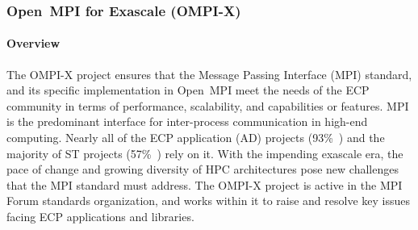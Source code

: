 \subsubsection{ Open~MPI for Exascale (OMPI-X)}\label{subsubsect:openmpi}



\paragraph{Overview}

The OMPI-X project ensures that the Message Passing Interface (MPI)
standard, and its specific implementation in Open~MPI meet the needs
of the ECP community in terms of performance, scalability, and
capabilities or features. MPI is the predominant interface for
inter-process communication in high-end computing.  Nearly all of the
ECP application (AD) projects (93\%~\cite{Bernholdt:2018:SMU-tr})
and the majority of ST projects
(57\%~\cite{Bernholdt:2018:SMU-tr}) rely on it.
With the impending exascale era, the
pace of change and growing diversity of HPC architectures pose new
challenges that the MPI standard must address.  The OMPI-X project is
active in the MPI Forum standards organization, and works within it to
raise and resolve key issues facing ECP applications and libraries.

